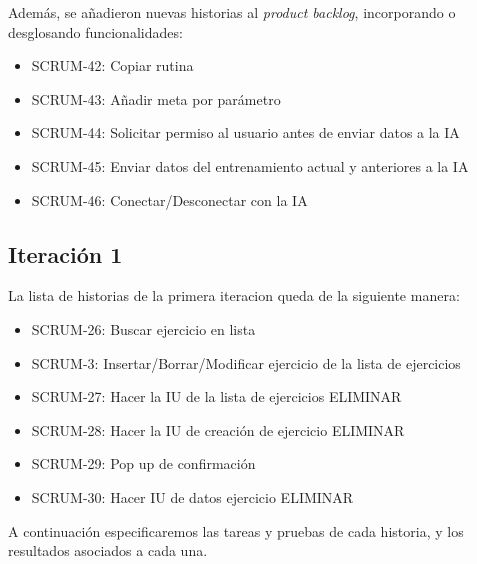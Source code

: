 Adem\'as, se a\~nadieron nuevas historias al \textit{product backlog}, incorporando o desglosando funcionalidades:

\begin{itemize}
  \item SCRUM-42: Copiar rutina
  \item SCRUM-43: Añadir meta por parámetro
  \item SCRUM-44: Solicitar permiso al usuario antes de enviar datos a la IA
  \item SCRUM-45: Enviar datos del entrenamiento actual y anteriores a la IA
  \item SCRUM-46: Conectar/Desconectar con la IA
\end{itemize}



\subsection{Iteraci\'on 1}
La lista de historias de la primera iteracion queda de la siguiente manera:

\begin{itemize}
    \item SCRUM-26: Buscar ejercicio en lista
    \item SCRUM-3: Insertar/Borrar/Modificar ejercicio de la lista de ejercicios
    \item SCRUM-27: Hacer la IU de la lista de ejercicios ELIMINAR
    \item SCRUM-28: Hacer la IU de creación de ejercicio ELIMINAR
    \item SCRUM-29: Pop up de confirmación
    \item SCRUM-30: Hacer IU de datos ejercicio ELIMINAR
\end{itemize}

A continuación especificaremos las tareas y pruebas de cada historia, y los resultados asociados a cada una. 

